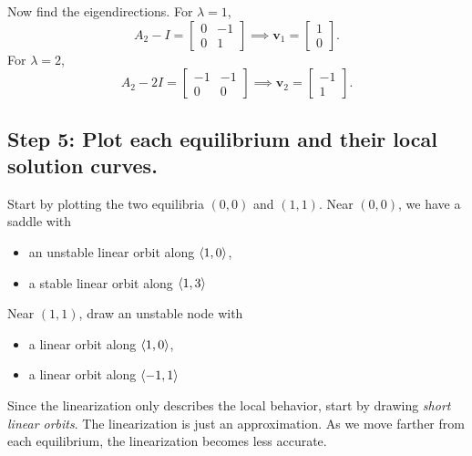 \documentclass[10pt,letterpaper]{article}
\begin{document}
Now find the eigendirections. For \(\lambda=1\),
\[
A_2-I=
\begin{bmatrix}
0 & -1\\
0 & 1
\end{bmatrix} \implies \mathbf{v}_1=
\begin{bmatrix}
1\\0
\end{bmatrix}.
\]
For \(\lambda=2\),
\[
A_2-2I=
\begin{bmatrix}
-1 & -1\\
0 & 0
\end{bmatrix} \implies \mathbf{v}_2=
\begin{bmatrix}
-1\\1
\end{bmatrix}.
\]

\subsection*{Step 5: Plot each equilibrium and their local solution curves.}
Start by plotting the two equilibria \((0,0)\) and \((1,1)\). Near \((0,0)\), we have a saddle with
\begin{itemize}
    \item an unstable linear orbit along $\left\langle 1,0\right\rangle$,
    \item a stable linear orbit along $\left\langle 1,3\right\rangle$
\end{itemize}
Near \((1,1)\), draw an unstable node with 
\begin{itemize}
    \item a linear orbit along $\left\langle 1,0\right\rangle$,
    \item a linear orbit along $\left\langle -1,1\right\rangle$
\end{itemize}
Since the linearization only describes the local behavior, start by drawing \textit{short linear orbits}. The linearization is just an approximation. As we move farther from each equilibrium, the linearization becomes less accurate.\pagebreak
\end{document}

